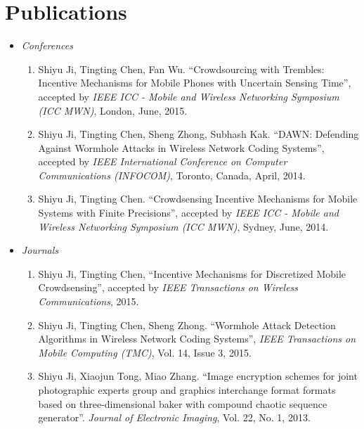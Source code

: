 \documentclass{article}
\begin{document}
\section{{Publications}}
\begin{itemize}
\item {\it Conferences}
\begin{enumerate}
\item Shiyu Ji, Tingting Chen, Fan Wu. ``Crowdsourcing with Trembles: Incentive Mechanisms for Mobile Phones with Uncertain Sensing Time'', accepted by {\it IEEE ICC - Mobile and Wireless Networking Symposium (ICC MWN)}, London, June, 2015.

\item Shiyu Ji, Tingting Chen, Sheng Zhong, Subhash Kak. ``DAWN: Defending Against Wormhole Attacks in Wireless Network Coding Systems'', accepted by {\it IEEE International Conference on Computer Communications (INFOCOM)}, Toronto, Canada, April, 2014.

\item Shiyu Ji, Tingting Chen. ``Crowdsensing Incentive Mechanisms for Mobile Systems with Finite Precisions'', accepted by {\it IEEE ICC - Mobile and Wireless Networking Symposium (ICC MWN)}, Sydney, June, 2014.
\end{enumerate}

\item{\it Journals}
\begin{enumerate}
\item Shiyu Ji, Tingting Chen, ``Incentive Mechanisms for Discretized Mobile Crowdsensing'', accepted by {\it IEEE Transactions on Wireless Communications}, 2015.

\item Shiyu Ji, Tingting Chen, Sheng Zhong. ``Wormhole Attack Detection Algorithms in Wireless Network Coding Systems'', {\it IEEE Transactions on Mobile Computing (TMC)}, Vol. 14, Issue 3, 2015.

\item Shiyu Ji, Xiaojun Tong, Miao Zhang. ``Image encryption schemes for joint photographic experts group and graphics interchange format formats based on three-dimensional baker with compound chaotic sequence generator''. {\it Journal of Electronic Imaging}, Vol. 22, No. 1, 2013.
\end{enumerate}
\end{itemize}
\end{document}
